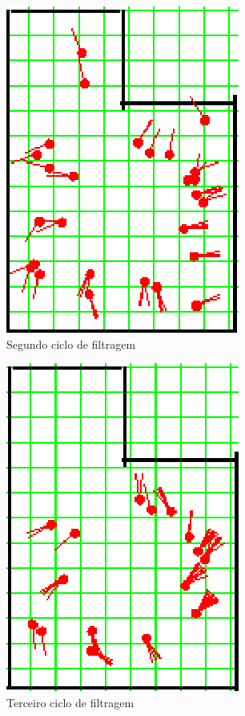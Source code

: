 \begin{figure}[H]
  \centering
  \includegraphics[scale=1]{figuras/cen2_ex3/3.eps}
  \caption[Segundo Ciclo de Filtragem]{Segundo ciclo de filtragem}
  \label{img:cen2_ex3_3}
\end{figure}

\begin{figure}[H]
  \centering
  \includegraphics[scale=1]{figuras/cen2_ex3/4.eps}
  \caption[Terceiro Ciclo de Filtragem]{Terceiro ciclo de filtragem}
  \label{img:cen2_ex3_4}
\end{figure}

